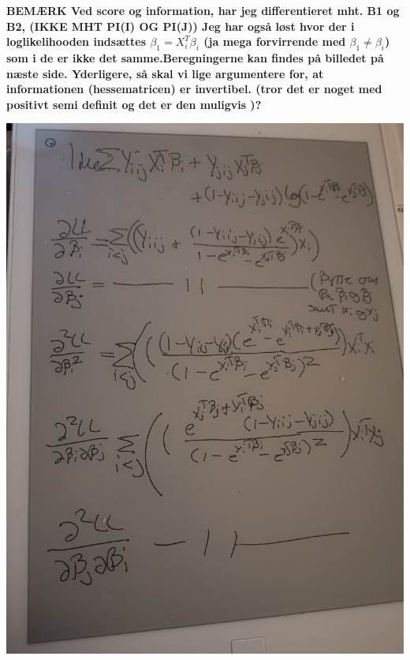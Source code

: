 \documentclass[11pt,a4paper]{article}
\begin{document}
\newpage
\textbf{BEMÆRK Ved score og information, har jeg differentieret mht. B1 og B2, (IKKE MHT PI(I) OG PI(J)) Jeg har også løst hvor der i loglikelihooden indsættes $\beta_1=X_i^T\beta_i$ (ja mega forvirrende med $\beta_1\neq \beta_i$) som i de er ikke det samme.Beregningerne kan findes på billedet på næste side.
Yderligere, så skal vi lige argumentere for, at informationen (hessematricen) er invertibel. (tror det er noget med positivt semi definit og det er den muligvis )?}
\begin{center}
    \includegraphics[scale=0.1]{ifmbt.jpg}
\end{center}
\end{document}
